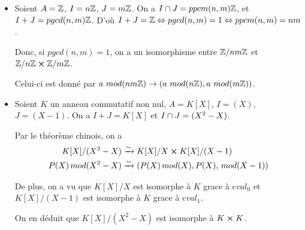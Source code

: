 \begin{exemple}
	\begin{itemize}
		\item Soient $A = \mathbb{Z}$, $I = n \mathbb{Z}$, $J = m\mathbb{Z}$. On a $I
			\cap J = ppcm(n, m) \mathbb{Z}$, et $I + J = pgcd(n, m) \mathbb{Z}$.
			D'où $I + J = \mathbb{Z} \Leftrightarrow pgcd(n, m) = 1 \Leftrightarrow ppcm(n, m) =
			nm$.

			Donc, si $pgcd(n, m) = 1$, on a un isomorphisme entre $\mathbb{Z} / nm
			\mathbb{Z}$ et $\mathbb{Z} / n \mathbb{Z} \cross \mathbb{Z} / m
			\mathbb{Z}$.

			Celui-ci est donné par $a \, \, mod(nm \mathbb{Z}) \rightarrow (a \,
			\, mod(n
			\mathbb{Z}), a \, \, mod(m \mathbb{Z}))$.
		\item Soient $K$ un anneau commutatif non nul, $A = K[X]$, $I = (X)$, $J
			= (X - 1)$. On a $I + J = K[X]$ et $I \cap J = (X^{2} - X)$.

			Par le théorème chinois, on a
			\begin{align}
				K[X] / (X^{2} - X) & \xrightarrow{\sim} K[X] / X \cross K[X] / (X -
				1) \\
				P(X) \, mod(X^{2} - X) & \xrightarrow{\sim} (P(X) \, mod(X), P(X), \,
				mod(X - 1))
			\end{align}
			
			De plus, on a vu que $K[X] / X$ est isomorphe à $K$ grace à
			$eval_{0}$ et $K[X] / (X - 1)$ est isomorphe à $K$ grace à
			$eval_{1}$.

			On en déduit que $K[X] / (X^{2} - X)$ est isomorphe à $K \cross
			K$.
	\end{itemize}
\end{exemple}



